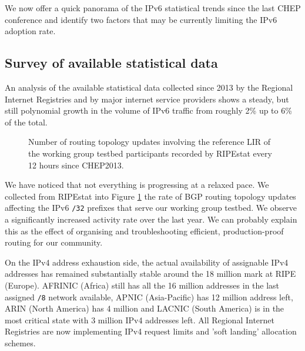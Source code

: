 We now offer a quick panorama of the IPv6 statistical trends since the last
CHEP conference and identify two factors that may be currently limiting 
the IPv6 adoption rate. 
\subsection{Survey of available statistical data}
An analysis of the available statistical data collected since 2013
by the Regional Internet Registries \cite{ripeipv6,arinstat,apnicstat,afrinicipv6,lacnicipc6} and by major internet
service providers \cite{akamaistats,googlestats} shows a steady, but
still polynomial growth in the volume of IPv6 traffic from roughly 
2\% up to 6\% of the total. 
\begin{figure} [h]
\centering
\def\svgwidth{\columnwidth}

\caption{Number of routing topology updates involving the reference LIR of the working group testbed participants recorded by RIPEstat \cite{ripestat} every 12 hours since CHEP2013.}
\label{fig:bgpupdates}
\end{figure}
We have noticed that not everything is progressing at a relaxed pace. We collected from RIPEstat \cite{ripestat} into Figure \ref{fig:bgpupdates} the
rate of BGP routing topology updates affecting
the IPv6 {\tt/32} prefixes that serve our
working group testbed. We observe a significantly increased activity rate over the
last year. We can probably explain this as the effect of organising and troubleshooting efficient, production-proof routing for our community.\par
On the IPv4 address exhaustion side, the actual availability of
assignable IPv4 addresses has remained substantially stable around the 18 million mark at RIPE (Europe). AFRINIC (Africa) still has all the 16 million addresses in the last assigned {\tt /8} network available, APNIC (Asia-Pacific) has 12 million address left, ARIN (North America) has 4 million and LACNIC (South America) is in
the most critical state with 3 million IPv4 addresses left.
All Regional Internet Registries are
now implementing IPv4 request limits and 'soft landing' allocation schemes.
